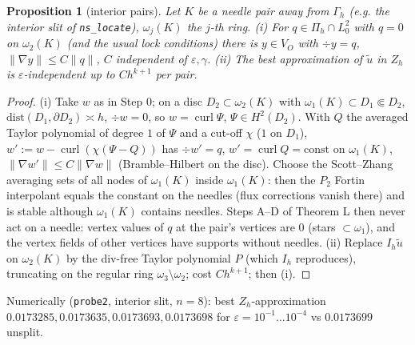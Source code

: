 \documentclass[11pt]{article}
\newtheorem{proposition}[theorem]{Proposition}
\theoremstyle{remark}
\newcommand{\VO}{V_O}
\newcommand{\Pih}{\Pi_h}
\newcommand{\norm}[1]{\|#1\|}
\newcommand{\curl}{\operatorname{curl}}
\begin{document}
\begin{proposition}[interior pairs]\label{prop:Sint}
Let $K$ be a needle pair away from $\Gamma_h$ (e.g. the interior slit of \texttt{ns\_locate}), $\omega_j(K)$ the $j$-th ring. (i) For $q\in\Pih\cap L^2_0$ with $q=0$ on
$\omega_2(K)$ (and the usual lock conditions) there is $y\in\VO$ with $\div y=q$, $\norm{\nabla y}\le C\norm q$, $C$ independent of $\varepsilon,\gamma$.
(ii) The best approximation of $\tilde u$ in $Z_h$ is $\varepsilon$-independent up to $Ch^{k+1}$ per pair.
\end{proposition}
\begin{proof}
(i) Take $w$ as in Step 0; on a disc $D_2\subset\omega_2(K)$ with $\omega_1(K)\subset D_1\Subset D_2$, $\mathrm{dist}(D_1,\partial D_2)\asymp h$, $\div w=0$, so $w=\curl\Psi$,
$\Psi\in H^2(D_2)$. With $Q$ the averaged Taylor polynomial of degree $1$ of $\Psi$ and a cut-off $\chi$ ($1$ on $D_1$), $w':=w-\curl(\chi(\Psi-Q))$ has
$\div w'=q$, $w'=\curl Q=\mathrm{const}$ on $\omega_1(K)$, $\norm{\nabla w'}\le C\norm{\nabla w}$ (Bramble--Hilbert on the disc). Choose the Scott--Zhang averaging sets
of all nodes of $\omega_1(K)$ inside $\omega_1(K)$: then the $P_2$ Fortin interpolant equals the constant on the needles (flux corrections vanish there) and is
stable although $\omega_1(K)$ contains needles. Steps A--D of Theorem L then never act on a needle: vertex values of $q$ at the pair's vertices are $0$
(stars $\subset\omega_1$), and the vertex fields of other vertices have supports without needles. (ii) Replace $I_h\tilde u$ on $\omega_2(K)$ by the
div-free Taylor polynomial $P$ (which $I_h$ reproduces), truncating on the regular ring $\omega_3\setminus\omega_2$; cost $Ch^{k+1}$; then (i).
\end{proof}
Numerically (\texttt{probe2}, interior slit, $n=8$): best $Z_h$-approximation $0.0173285,0.0173635,0.0173693,0.0173698$ for $\varepsilon=10^{-1}\dots10^{-4}$ vs $0.0173699$
unsplit.
\end{document}
